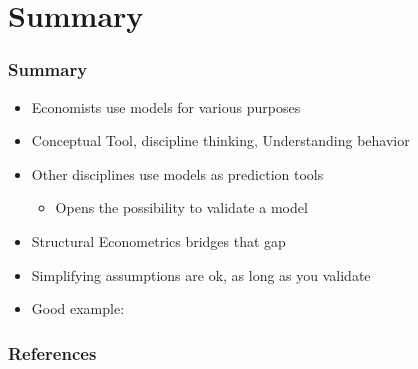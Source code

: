 \documentclass[11pt]{beamer}
\begin{document}
\section{Summary}


\begin{frame}[c]\frametitle{Summary}
\begin{itemize}
    \item Economists use models for various purposes
    \item Conceptual Tool, discipline thinking, Understanding behavior
    \item Other disciplines use models as prediction tools
    \begin{itemize}
        \item Opens the possibility to validate a model
    \end{itemize}
    \item Structural Econometrics bridges that gap
    \item Simplifying assumptions are ok, as long as you validate
    \item Good example: \cite{Todd2006}

\end{itemize}
\end{frame}







\appendix
\begin{frame}[allowframebreaks]
    \frametitle{References}
    \renewcommand{\bibfont}{\normalfont\footnotesize}
    \printbibliography
\end{frame}
\end{document}
